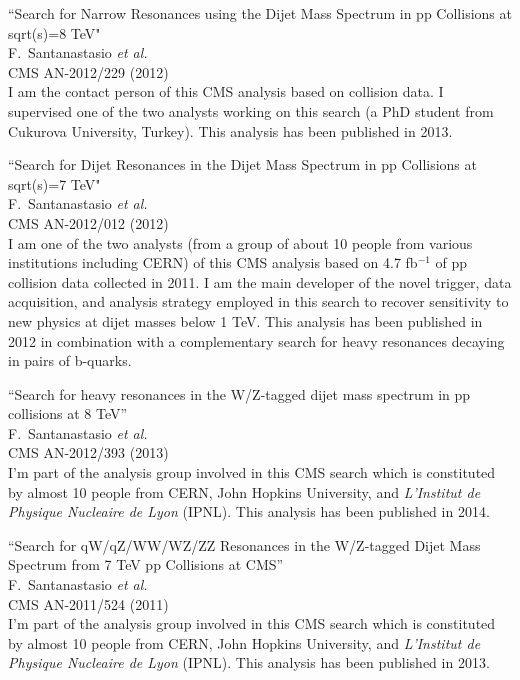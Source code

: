 \documentclass[10pt, a4paper]{article}
\begin{document}
\begin{thebibliography}{599}
``Search for Narrow Resonances using the Dijet Mass Spectrum in pp Collisions at sqrt(s)=8 TeV"
  \\{}F.~Santanastasio {\it et al.}
  \\{}CMS AN-2012/229 (2012)
  \\ I am the contact person of this CMS analysis based on collision data. I supervised one of the two analysts working on this search (a PhD student from Cukurova University, Turkey). This analysis has been published in 2013.

``Search for Dijet Resonances in the Dijet Mass Spectrum in pp Collisions at sqrt(s)=7 TeV"
  \\{}F.~Santanastasio {\it et al.}
  \\{}CMS AN-2012/012 (2012)
  \\ I am one of the two analysts (from a group of about 10 people from various 
  institutions including CERN) of this CMS analysis based on 4.7 fb$^{-1}$ of pp collision 
  data collected in 2011. I am the main developer of the novel trigger, data acquisition, and analysis strategy employed in this search to recover sensitivity to new physics at dijet masses below 1 TeV. This analysis has been published in 2012 in combination with a complementary search for heavy resonances decaying in pairs of b-quarks.

``Search for heavy resonances in the W/Z-tagged dijet mass spectrum in pp collisions at 8 TeV''
  \\{}F.~Santanastasio {\it et al.}
  \\{}CMS AN-2012/393 (2013)
  \\ I'm part of the analysis group involved in this CMS search which is constituted by almost 10 people from CERN, John Hopkins University, and \textit{L'Institut de Physique Nucleaire de Lyon} (IPNL). This analysis has been published in 2014.

``Search for qW/qZ/WW/WZ/ZZ Resonances in the W/Z-tagged Dijet Mass Spectrum from 7 TeV pp Collisions at CMS''
  \\{}F.~Santanastasio {\it et al.}
  \\{}CMS AN-2011/524 (2011)
  \\ I'm part of the analysis group involved in this CMS search which is constituted by almost 10 people from CERN, John Hopkins University, and \textit{L'Institut de Physique Nucleaire de Lyon} (IPNL). This analysis has been published in 2013.


\end{thebibliography}
\end{document}
